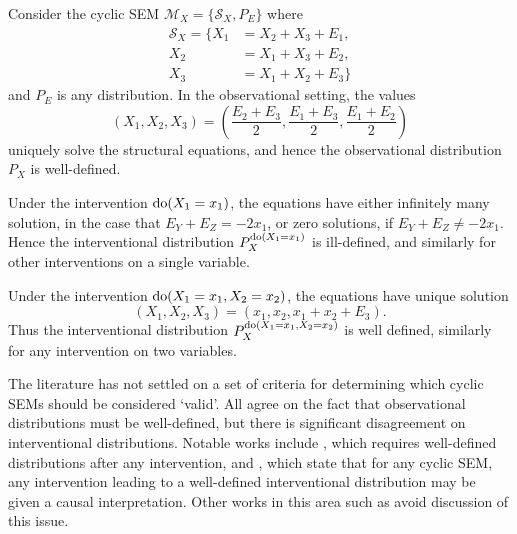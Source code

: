 \begin{example}\label{example:causality-cyclic-invalid}
Consider the cyclic SEM $\mathcal{M}_X=\{\mathcal{S}_X, P_E\}$ where
%
\begin{align*}
\mathcal{S}_X = \big\{  X_1 &= X_2 + X_3 + E_1, \\
					    X_2 &= X_1 + X_3 + E_2, \\
					    X_3 &= X_1 + X_2 + E_3\big\}
\end{align*}
%
and $P_E$ is any distribution.
In the observational setting, the values 
\[(X_1, X_2, X_3) = \left(\frac{E_2 + E_3}{2}, \frac{E_1 + E_3}{2}, \frac{E_1 + E_2}{2}\right)\]
uniquely solve the structural equations, and hence the observational distribution $P_X$ is well-defined. 

Under the intervention $\operatorname{do}(X_1 = x_1)$, the equations have either infinitely many solution, in the case that $E_Y + E_Z = -2 x_1$, or zero solutions, if $E_Y + E_Z \not= -2 x_1$. 
Hence the interventional distribution $P_X^{\operatorname{do}(X_1 = x_1)}$ is ill-defined, and similarly for other interventions on a single variable.

Under the intervention $\operatorname{do}(X_1=x_1, X_2=x_2)$, the equations have unique solution 
\[(X_1, X_2, X_3) = \left(x_1, x_2, x_1 + x_2 + E_3 \right).\]
Thus the interventional distribution $P_X^{\operatorname{do}(X_1 = x_1, X_2=x_2)}$ is well defined, similarly for any intervention on two variables.
\end{example}


The literature has not settled on a set of criteria for determining which cyclic SEMs should be considered `valid'. 
All agree on the fact that observational distributions must be well-defined, but there is significant disagreement on interventional distributions.
Notable works include \cite{hyttinen2010causal}, which requires well-defined distributions after any intervention, and \cite{mooij2011causal}, which state that for any cyclic SEM, any intervention leading to a well-defined interventional distribution may be given a causal interpretation. Other works in this area such as \cite{lacerda2012discovering} avoid discussion of this issue.

